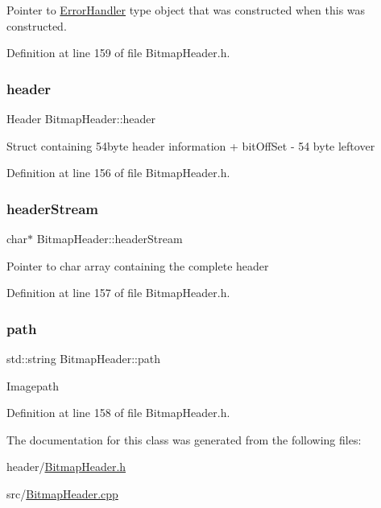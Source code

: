 Pointer to \mbox{\hyperlink{classErrorHandler}{Error\+Handler}} type object that was constructed when this was constructed. 

Definition at line 159 of file Bitmap\+Header.\+h.

\mbox{\label{classBitmapHeader_ab1e2a2c32e87d647977bbd3e700f2265}} 
\subsubsection{\texorpdfstring{header}{header}}
{\footnotesize\ttfamily Header Bitmap\+Header\+::header\hspace{0.3cm}{\ttfamily [private]}}

Struct containing 54byte header information + bit\+Off\+Set -\/ 54 byte leftover 

Definition at line 156 of file Bitmap\+Header.\+h.

\mbox{\label{classBitmapHeader_a9109a897251733f77942008318482426}} 
\subsubsection{\texorpdfstring{headerStream}{headerStream}}
{\footnotesize\ttfamily char$\ast$ Bitmap\+Header\+::header\+Stream\hspace{0.3cm}{\ttfamily [private]}}

Pointer to char array containing the complete header 

Definition at line 157 of file Bitmap\+Header.\+h.

\mbox{\label{classBitmapHeader_a928111fbaf59eebf24b750cbca11c5dd}} 
\subsubsection{\texorpdfstring{path}{path}}
{\footnotesize\ttfamily std\+::string Bitmap\+Header\+::path\hspace{0.3cm}{\ttfamily [private]}}

Imagepath 

Definition at line 158 of file Bitmap\+Header.\+h.



The documentation for this class was generated from the following files\+:\begin{DoxyCompactItemize}
\item 
header/\mbox{\hyperlink{BitmapHeader_8h}{Bitmap\+Header.\+h}}\item 
src/\mbox{\hyperlink{BitmapHeader_8cpp}{Bitmap\+Header.\+cpp}}\end{DoxyCompactItemize}
